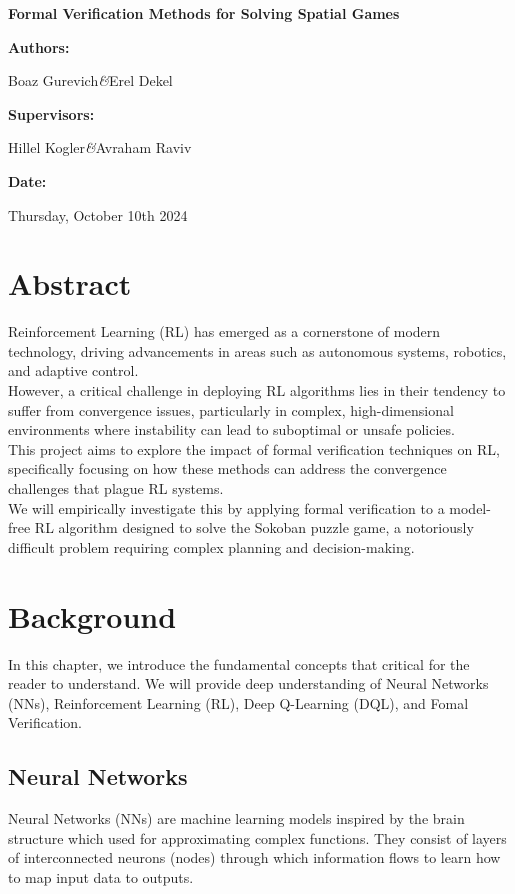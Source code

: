 \documentclass[12pt,a4paper]{report}
\newcommand{\projectname}{Formal Verification Methods for Solving Spatial Games}
\newcommand{\firstauthor}{Boaz Gurevich}
\newcommand{\secondauthor}{Erel Dekel}
\newcommand{\firstsupervisor}{Hillel Kogler}
\newcommand{\secondsupervisor}{Avraham Raviv}
\newcommand{\submissiondate}{Thursday, October 10th 2024}
\renewcommand{\maketitle}{
    \begin{titlepage}
        \centering
        \vspace*{2cm}
        
        {\huge\bfseries\projectname\par}
        \vspace{1.5cm}
        
        {\large\textbf{Authors:}\par}
        \vspace{0.5cm}
        {\large\firstauthor\hspace{0.3cm}\textit{\&}\hspace{0.3cm}\secondauthor\par}
        
        \vspace{2cm}
        
        {\large\textbf{Supervisors:}\par}
        \vspace{0.5cm}
        {\large\firstsupervisor\hspace{0.3cm}\textit{\&}\hspace{0.3cm}\secondsupervisor\par}
        
        \vspace{2cm}

        {\large\textbf{Date:}\par}
        \vspace{0.5cm}
        {\large\submissiondate\par}
    \end{titlepage}
}
\begin{document}
\hypersetup{
    linkcolor=blue,
    urlcolor=blue,
    linktoc=all
}

\maketitle

\chapter*{Abstract}
Reinforcement Learning (RL) has emerged as a cornerstone of modern technology, driving advancements in areas such as autonomous systems, robotics, and adaptive control.\\
However, a critical challenge in deploying RL algorithms lies in their tendency to suffer from convergence issues, particularly in complex, high-dimensional environments where instability can lead to suboptimal or unsafe policies.\\
This project aims to explore the impact of formal verification techniques on RL, specifically focusing on how these methods can address the convergence challenges that plague RL systems.\\
We will empirically investigate this by applying formal verification to a model-free RL algorithm designed to solve the Sokoban puzzle game, a notoriously difficult problem requiring complex planning and decision-making.\\

\tableofcontents

\chapter{Background}
In this chapter, we introduce the fundamental concepts that critical for the reader to understand.
We will provide deep understanding of Neural Networks (NNs), Reinforcement Learning (RL), Deep Q-Learning (DQL), and Fomal Verification.
\section{Neural Networks}
Neural Networks (NNs) are machine learning models inspired by the brain structure which used for approximating complex functions. They consist of layers of interconnected neurons (nodes) through which information flows to learn how to map input data to outputs.
\end{document}
